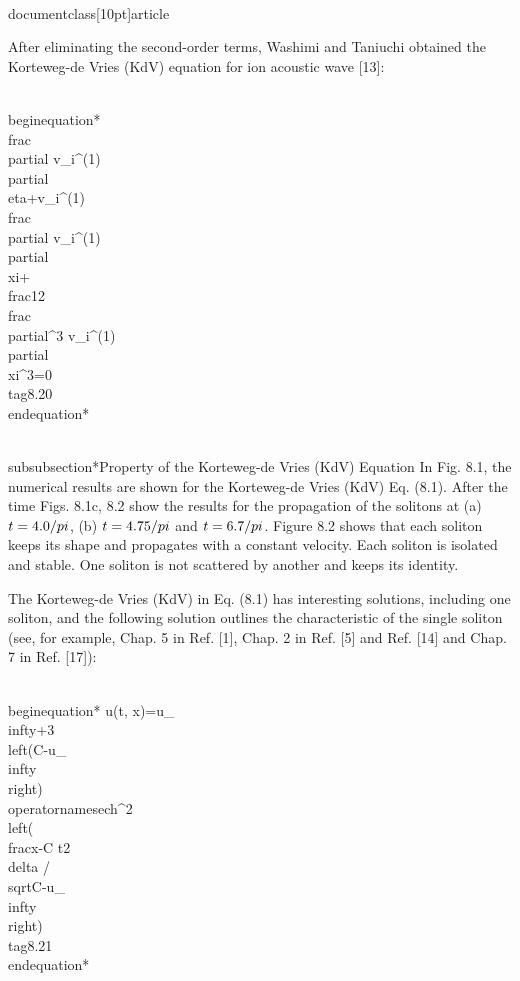 \\documentclass[10pt]{article}
\begin{document}
{{{{{After eliminating the second-order terms, Washimi and Taniuchi obtained the Korteweg-de Vries (KdV) equation for ion acoustic wave [13]:


\\begin{equation*}
\\frac{\\partial v_{i}^{(1)}}{\\partial \\eta}+v_{i}^{(1)} \\frac{\\partial v_{i}^{(1)}}{\\partial \\xi}+\\frac{1}{2} \\frac{\\partial^{3} v_{i}^{(1)}}{\\partial \\xi^{3}}=0 \\tag{8.20}
\\end{equation*}


\\subsubsection*{Property of the Korteweg-de Vries (KdV) Equation}
In Fig. 8.1, the numerical results are shown for the Korteweg-de Vries (KdV) Eq. (8.1). After the time Figs. 8.1c, 8.2 show the results for the propagation of the solitons at (a) $t=4.0 / \\pi$, (b) $t=4.75 / \\pi$ and $t=6.7 / \\pi$. Figure 8.2 shows that each soliton keeps its shape and propagates with a constant velocity. Each soliton is isolated and stable. One soliton is not scattered by another and keeps its identity.

The Korteweg-de Vries (KdV) in Eq. (8.1) has interesting solutions, including one soliton, and the following solution outlines the characteristic of the single soliton (see, for example, Chap. 5 in Ref. [1], Chap. 2 in Ref. [5] and Ref. [14] and Chap. 7 in Ref. [17]):


\\begin{equation*}
u(t, x)=u_{\\infty}+3\\left(C-u_{\\infty}\\right) \\operatorname{sech}^{2}\\left(\\frac{x-C t}{2 \\delta / \\sqrt{C-u_{\\infty}}}\\right) \\tag{8.21}
\\end{equation*}


}}}}}
\end{document}
